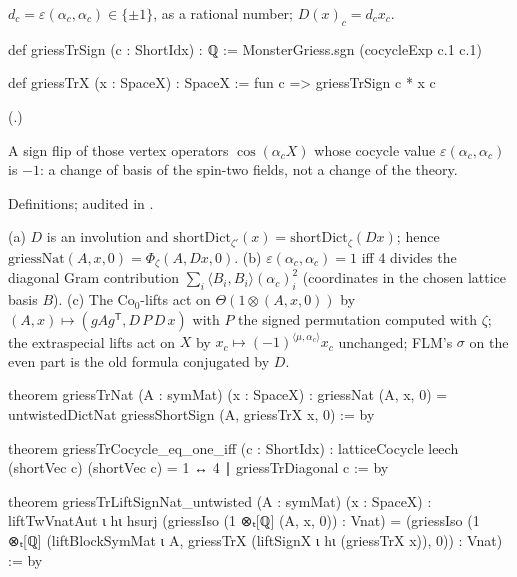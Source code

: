 \begin{definition}\label{ch21:def:griessTrX}
$d_c=\varepsilon(\alpha_c,\alpha_c)\in\{\pm1\}$, as a rational number; $D(x)_c=d_cx_c$.
\end{definition}
\begin{leancode}
def griessTrSign (c : ShortIdx) : ℚ := MonsterGriess.sgn (cocycleExp c.1 c.1)
\end{leancode}
\begin{leancode}
def griessTrX (x : SpaceX) : SpaceX := fun c => griessTrSign c * x c
\end{leancode}
(.)
\begin{physics}
A sign flip of those vertex operators $\cos(\alpha_cX)$ whose cocycle value $\varepsilon(\alpha_c,\alpha_c)$
is $-1$: a change of basis of the spin-two fields, not a change of the theory.
\end{physics}
\begin{status}
Definitions; audited in .
\end{status}
\begin{theorem}[Transfer]\label{ch21:thm:transfer}
(a) $D$ is an involution and $\mathrm{shortDict}_{\zeta'}(x)=\mathrm{shortDict}_\zeta(Dx)$; hence
$\mathrm{griessNat}(A,x,0)=\Phi_\zeta(A,Dx,0)$.
(b) $\varepsilon(\alpha_c,\alpha_c)=1$ iff $4$ divides the diagonal Gram contribution
$\sum_i\langle B_i,B_i\rangle(\alpha_c)_i^2$ (coordinates in the chosen lattice basis $B$).
(c) The $\mathrm{Co}_0$-lifts act on $\Theta(1\otimes(A,x,0))$ by $(A,x)\mapsto(gAg^{\mathsf T},D\,P\,D\,x)$ with $P$ the
signed permutation computed with $\zeta$; the extraspecial lifts act on $X$ by
$x_c\mapsto(-1)^{\langle\mu,\alpha_c\rangle}x_c$ unchanged; FLM's $\sigma$ on the even part is the old formula
conjugated by $D$.
\end{theorem}
\begin{leancode}
theorem griessTrNat (A : symMat) (x : SpaceX) :
    griessNat (A, x, 0) = untwistedDictNat griessShortSign (A, griessTrX x, 0) := by
\end{leancode}
\begin{leancode}
theorem griessTrCocycle_eq_one_iff (c : ShortIdx) :
    latticeCocycle leech (shortVec c) (shortVec c) = 1 ↔ 4 ∣ griessTrDiagonal c := by
\end{leancode}
\begin{leancode}
theorem griessTrLiftSignNat_untwisted (A : symMat) (x : SpaceX) :
    liftTwVnatAut ι hι hsurj (griessIso (1 ⊗ₜ[ℚ] (A, x, 0)) : Vnat) =
      (griessIso (1 ⊗ₜ[ℚ]
        (liftBlockSymMat ι A, griessTrX (liftSignX ι hι (griessTrX x)), 0)) : Vnat) := by
\end{leancode}
